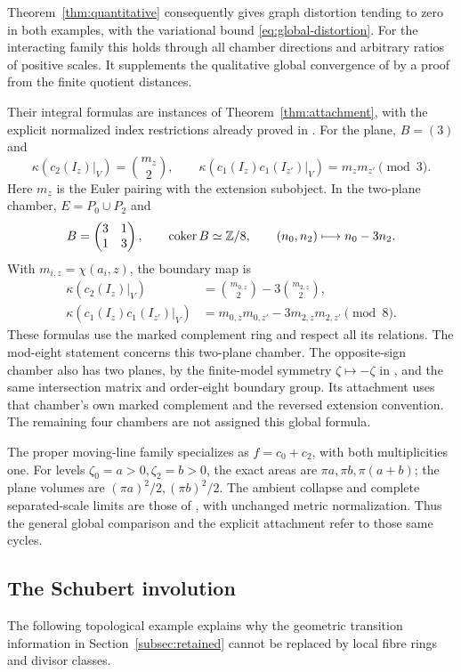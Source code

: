 Theorem~\ref{thm:quantitative} consequently gives graph distortion
tending to zero in both examples, with the variational bound
\eqref{eq:global-distortion}. For the interacting family this
holds through all chamber directions and arbitrary ratios of
positive scales. It supplements the qualitative global
convergence of \cite{wuebben17} by a proof from the finite
quotient distances.

Their integral formulas are instances of
Theorem~\ref{thm:attachment}, with the explicit normalized
index restrictions already proved in
\cite[Proposition~6.1]{wuebben17}.
For the plane, \(B=(3)\) and
\[
 \kappa(c_2(I_z)|_V)=\binom{m_z}{2},\qquad
 \kappa(c_1(I_z)c_1(I_{z'})|_V)=m_zm_{z'}\pmod3.
\]
Here \(m_z\) is the Euler pairing with the extension subobject.
In the two-plane chamber, \(E=P_0\cup P_2\) and
\[
 B=\begin{pmatrix}3&1\\1&3\end{pmatrix},\qquad
 \operatorname{coker} B\simeq\mathbb Z/8,\qquad (n_0,n_2)\longmapsto n_0-3n_2 .
\]
With \(m_{i,z}=\chi(a_i,z)\), the boundary map is
\[
 \begin{aligned}
 \kappa(c_2(I_z)|_V)
   &=\binom{m_{0,z}}2-3\binom{m_{2,z}}2,\\
 \kappa(c_1(I_z)c_1(I_{z'})|_V)
   &=m_{0,z}m_{0,z'}-3m_{2,z}m_{2,z'}\pmod8 .
 \end{aligned}
\]
These formulas use the marked complement ring and respect all
its relations. The mod-eight statement concerns this
two-plane chamber. The opposite-sign chamber also has two
planes, by the finite-model symmetry \(\zeta\mapsto-\zeta\)
in \cite[Section~5]{wuebben17}, and the same intersection matrix
and order-eight boundary group. Its attachment uses that chamber's
own marked complement and the reversed extension convention.
The remaining four chambers are not assigned this global formula.

The proper moving-line family specializes as \(f=c_0+c_2\),
with both multiplicities one. For levels
\(\zeta_0=a>0,\zeta_2=b>0\), the exact areas are
\(\pi a,\pi b,\pi(a+b)\); the plane volumes are
\((\pi a)^2/2,(\pi b)^2/2\).
The ambient collapse and complete separated-scale limits are
those of \cite[Section~8]{wuebben17}, with unchanged metric
normalization. Thus the general global comparison and the
explicit attachment refer to those same cycles.

\subsection{The Schubert involution}
The following topological example explains why the geometric
transition information in Section~\ref{subsec:retained} cannot
be replaced by local fibre rings and divisor classes.

